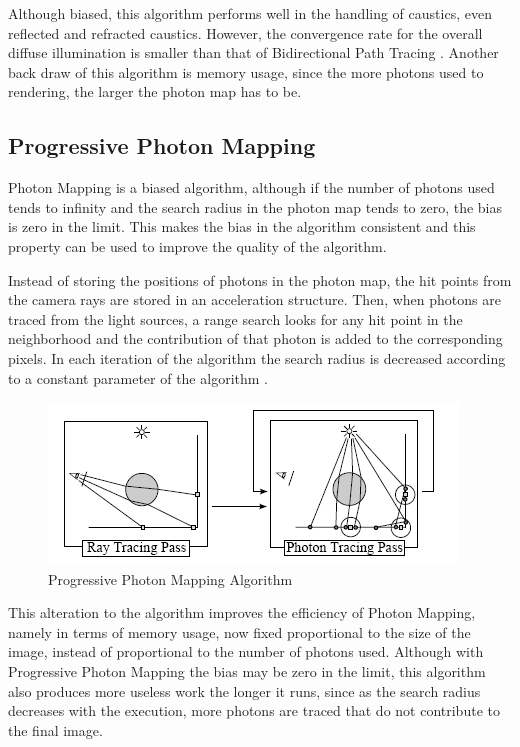 Although biased, this algorithm performs well in the handling of caustics, even reflected and refracted caustics. However, the convergence rate for the overall diffuse illumination is smaller than that of Bidirectional Path Tracing \citep{Georgiev}. Another back draw of this algorithm is memory usage, since the more photons used to rendering, the larger the photon map has to be.

\subsection{Progressive Photon Mapping}

Photon Mapping is a biased algorithm, although if the number of photons used tends to infinity and the search radius in the photon map tends to zero, the bias is zero in the limit. This makes the bias in the algorithm consistent and this property can be used to improve the quality of the algorithm.

Instead of storing the positions of photons in the photon map, the hit points from the camera rays are stored in an acceleration structure. Then, when photons are traced from the light sources, a range search looks for any hit point in the neighborhood and the contribution of that photon is added to the corresponding pixels. In each iteration of the algorithm the search radius is decreased according to a constant parameter of the algorithm \citep{Hachisuka}.

\begin{figure}[H]
\centering
\includegraphics[width=0.75\linewidth]{img/ppmDiagram.png}
\caption{\label{img:ppmdiag} Progressive Photon Mapping Algorithm}
\end{figure}

This alteration to the algorithm improves the efficiency of Photon Mapping, namely in terms of memory usage, now fixed proportional to the size of the image, instead of proportional to the number of photons used. Although with Progressive Photon Mapping the bias may be zero in the limit, this algorithm also produces more useless work the longer it runs, since as the search radius decreases with the execution, more photons are traced that do not contribute to the final image.

